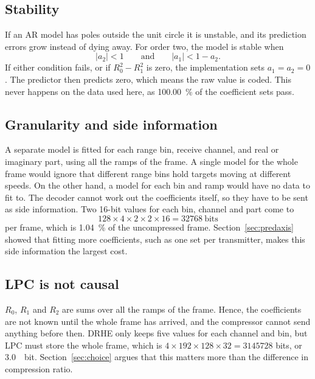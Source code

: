 \subsection{Stability}

If an AR model has poles outside the unit circle it is unstable, and its
prediction errors grow instead of dying away. For order two, the model is
stable when
\begin{equation}
\label{eq:stability}
|a_2| < 1
\qquad\text{and}\qquad
|a_1| < 1 - a_2 .
\end{equation}
If either condition fails, or if $R_0^2 - R_1^2$ is zero, the implementation
sets $a_1 = a_2 = 0$. The predictor then predicts zero, which means the raw
value is coded. This never happens on the data used here, as
\SI{100.00}{\percent} of the coefficient sets pass.

\subsection{Granularity and side information}

A separate model is fitted for each range bin, receive channel, and real or
imaginary part, using all the ramps of the frame. A single model for the whole
frame would ignore that different range bins hold targets moving at different
speeds. On the other hand, a model for each bin and ramp would have no data to
fit to. The decoder cannot work out the coefficients itself, so they have to be
sent as side information. Two 16-bit values for each bin, channel and part
come to
\begin{equation}
128 \times 4 \times 2 \times 2 \times 16 = \num{32768}\ \text{bits}
\end{equation}
per frame, which is \SI{1.04}{\percent} of the uncompressed frame.
Section~\ref{sec:predaxis} showed that fitting more coefficients, such as one
set per transmitter, makes this side information the largest cost.

\subsection{LPC is not causal}

$R_0$, $R_1$ and $R_2$ are sums over all the ramps of the frame. Hence, the
coefficients are not known until the whole frame has arrived, and the
compressor cannot send anything before then. DRHE only keeps five values for
each channel and bin, but LPC must store the whole frame, which is
$4 \times 192 \times 128 \times 32 = \num{3145728}$ bits, or
\SI{3.0}{\mebi bit}. Section~\ref{sec:choice} argues that this matters more
than the difference in compression ratio.

